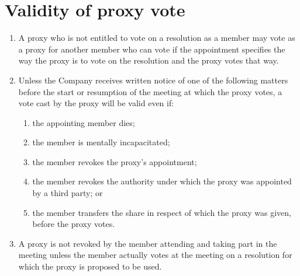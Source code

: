 \section{Validity of proxy vote}

\begin{enumerate}[label=(\alph*)]
    \item A proxy who is not entitled to vote on a resolution as a member may vote as a proxy for another member who can vote if the appointment specifies the way the proxy is to vote on the resolution and the proxy votes that way.
    
    \item Unless the Company receives written notice of one of the following matters before the start or resumption of the meeting at which the proxy votes, a vote cast by the proxy will be valid even if:
    \begin{enumerate}[label=(\roman*)]
        \item the appointing member dies;
        \item the member is mentally incapacitated;
        \item the member revokes the proxy's appointment;
        \item the member revokes the authority under which the proxy was appointed by a third party; or
        \item the member transfers the share in respect of which the proxy was given, before the proxy votes.
    \end{enumerate}
    
    \item A proxy is not revoked by the member attending and taking part in the meeting unless the member actually votes at the meeting on a resolution for which the proxy is proposed to be used.
\end{enumerate} 